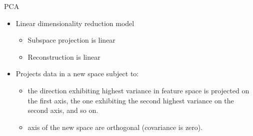 \begin{frame}{PCA}
\begin{itemize}
\item Linear dimensionality reduction model
\begin{itemize}
\item Subspace projection is linear
\item Reconstruction is linear
\end{itemize}
\item Projects data in a new space subject to:
\begin{itemize}
\item the direction exhibiting highest variance in feature space is projected on the first axis, the one exhibiting the second highest variance on the second axis, and so on.
\item axis of the new space are orthogonal (covariance is zero).
\end{itemize}
\end{itemize}
\end{frame}
